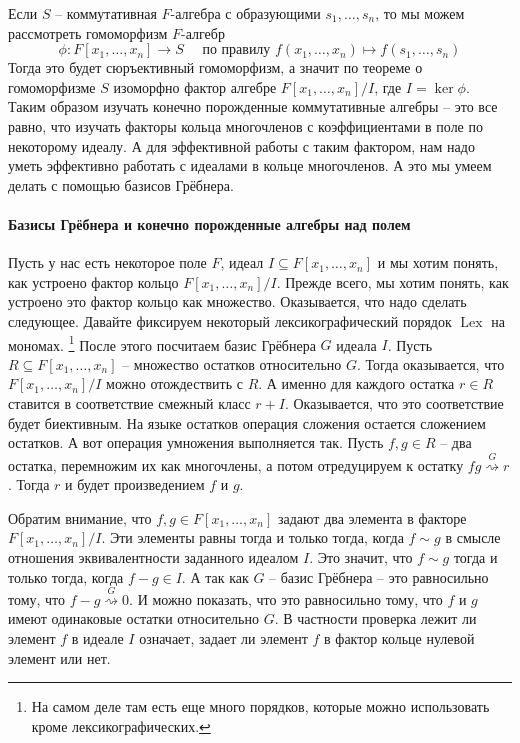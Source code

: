 Если $S$ -- коммутативная $F$-алгебра с образующими $s_1,\ldots,s_n$, то мы можем рассмотреть гомоморфизм $F$-алгебр
\[
\phi\colon F[x_1,\ldots, x_n]\to S\quad\text{ по правилу }f(x_1,\ldots,x_n) \mapsto f(s_1,\ldots,s_n)
\]
Тогда это будет сюръективный гомоморфизм, а значит по теореме о гомоморфизме $S$ изоморфно фактор алгебре $F[x_1,\ldots, x_n]/I$, где $I = \ker \phi$.
Таким образом изучать конечно порожденные коммутативные алгебры -- это все равно, что изучать факторы кольца многочленов с коэффициентами в поле по некоторому идеалу.
А для эффективной работы с таким фактором, нам надо уметь эффективно работать с идеалами в кольце многочленов.
А это мы умеем делать с помощью базисов Грёбнера.

\paragraph{Базисы Грёбнера и конечно порожденные алгебры над полем}

Пусть у нас есть некоторое поле $F$, идеал $I\subseteq F[x_1,\ldots,x_n]$ и мы хотим понять, как устроено фактор кольцо $F[x_1,\ldots,x_n]/I$.
Прежде всего, мы хотим понять, как устроено это фактор кольцо как множество.
Оказывается, что надо сделать следующее.
Давайте фиксируем некоторый лексикографический порядок $\operatorname{Lex}$ на мономах.%
\footnote{На самом деле там есть еще много порядков, которые можно использовать кроме лексикографических.}
После этого посчитаем базис Грёбнера $G$ идеала $I$.
Пусть $R\subseteq F[x_1,\ldots,x_n]$ -- множество остатков относительно $G$.
Тогда оказывается, что $F[x_1,\ldots,x_n]/I$ можно отождествить с $R$.
А именно для каждого остатка $r\in R$ ставится в соответствие смежный класс $r+I$.
Оказывается, что это соответствие будет биективным.
На языке остатков операция сложения остается сложением остатков.
А вот операция умножения выполняется так.
Пусть $f,g\in R$ -- два остатка, перемножим их как многочлены, а потом отредуцируем к остатку $fg \stackrel{G}{\rightsquigarrow}r$.
Тогда $r$ и будет произведением $f$ и $g$.

Обратим внимание, что $f,g\in F[x_1,\ldots, x_n]$ задают два элемента в факторе $F[x_1,\ldots,x_n]/I$.
Эти элементы равны тогда и только тогда, когда $f\sim g$ в смысле отношения эквивалентности заданного идеалом $I$.
Это значит, что $f\sim g$ тогда и только тогда, когда $f-g\in I$.
А так как $G$ -- базис Грёбнера -- это равносильно тому, что $f - g \stackrel{G}{\rightsquigarrow}0$.
И можно показать, что это равносильно тому, что $f$ и $g$ имеют одинаковые остатки относительно $G$.
В частности проверка лежит ли элемент $f$ в идеале $I$ означает, задает ли элемент $f$ в фактор кольце нулевой элемент или нет.